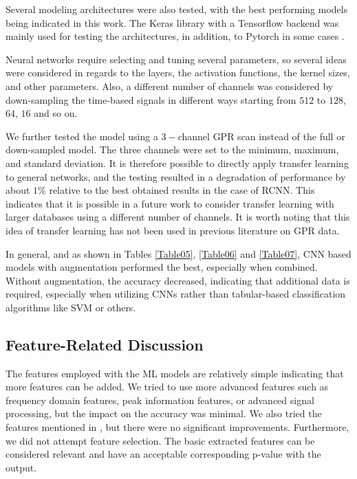 \documentclass{ieeeaccess}
\begin{document}
Several modeling architectures were also tested, with the best performing models being indicated in this work. The Keras library \cite{Chollet2018} with a Tensorflow \cite{Abadi2016} backend was mainly used for testing the architectures, in addition, to Pytorch in some cases \cite{Paszke2019}. 

Neural networks require selecting and tuning several parameters, so several ideas were considered in regards to the layers, the activation functions, the kernel sizes, and other parameters. Also, a different number of channels was considered by down-sampling the time-based signals in different ways starting from $512$ to $128$, $64$, $16$ and so on.

We further tested the model using a $3-$channel GPR scan instead of the full or down-sampled model. The three channels were set to the minimum, maximum, and standard deviation. It is therefore possible to directly apply transfer learning to general networks, and the testing resulted in a degradation of performance by about $1\%$ relative to the best obtained results in the case of RCNN. This indicates that it is possible in a future work to consider transfer learning with larger databases using a different number of channels. It is worth noting that this idea of transfer learning has not been used in previous literature on GPR data.

In general, and as shown in Tables \ref{Table05}, \ref{Table06} and \ref{Table07}, CNN based models with augmentation performed the best, especially when combined. Without augmentation, the accuracy decreased, indicating that additional data is required, especially when utilizing CNNs rather than tabular-based classification algorithms like SVM or others.

\subsection{Feature-Related Discussion}
The features employed with the ML models are relatively simple indicating that more features can be added. We tried to use more advanced features such as frequency domain features, peak information features, or advanced signal processing, but the impact on the accuracy was minimal. We also tried the features mentioned in \cite{Abeynayake2019}, but there were no significant improvements. Furthermore, we did not attempt feature selection. The basic extracted features can be considered relevant and have an acceptable corresponding p-value with the output.
\end{document}
